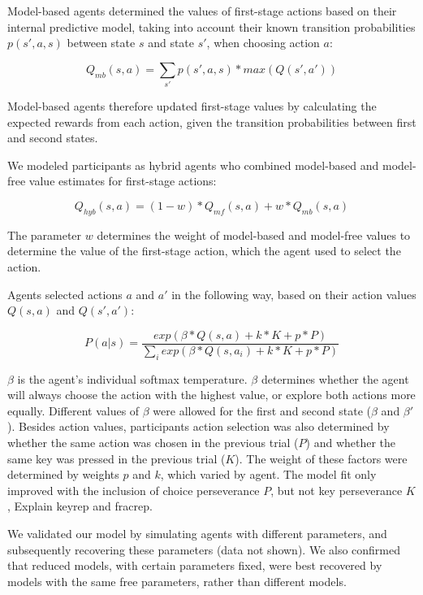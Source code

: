 \documentclass[11pt]{article} %
\begin{document}
Model-based agents determined the values of first-stage actions based on their internal predictive model, taking into account their known transition probabilities $p(s', a, s)$ between state $s$ and state $s'$, when choosing action $a$:

\begin{equation}
Q_{mb}(s, a) = \sum_{s'} p(s', a, s) * max(Q(s', a'))
\end{equation}

Model-based agents therefore updated first-stage values by calculating the expected rewards from each action, given the transition probabilities between first and second states.

We modeled participants as hybrid agents who combined model-based and model-free value estimates for first-stage actions:

\begin{equation}
Q_{hyb}(s, a) = (1 - w) * Q_{mf}(s, a) + w * Q_{mb}(s, a)
\end{equation}

The parameter $w$ determines the weight of model-based and model-free values to determine the value of the first-stage action, which the agent used to select the action.

Agents selected actions $a$ and $a'$ in the following way, based on their action values $Q(s, a)$ and $Q(s', a')$:

\begin{equation}
P(a|s) = \frac{exp(\beta * Q(s, a) + k * K + p * P)}{\sum_{i} exp(\beta * Q(s, a_{i}) + k * K + p * P)}
\end{equation}

$\beta$ is the agent's individual softmax temperature. $\beta$ determines whether the agent will always choose the action with the highest value, or explore both actions more equally. Different values of $\beta$ were allowed for the first and second state ($\beta$ and $\beta'$). Besides action values, participants action selection was also determined by whether the same action was chosen in the previous trial ($P$) and whether the same key was pressed in the previous trial ($K$). The weight of these factors were determined by weights $p$ and $k$, which varied by agent. The model fit only improved with the inclusion of choice perseverance $P$, but not key perseverance $K$, 
Explain keyrep and fracrep.

We validated our model by simulating agents with different parameters, and subsequently recovering these parameters (data not shown). We also confirmed that reduced models, with certain parameters fixed, were best recovered by models with the same free parameters, rather than different models. 
\end{document}
